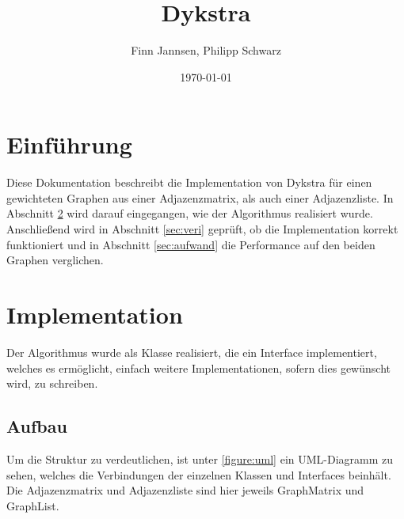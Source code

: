 \documentclass[11pt]{scrartcl}
\title{Dykstra}
\author{Finn Jannsen, Philipp Schwarz}
\date{\today{}}
\begin{document}
\maketitle

\tableofcontents

\section{Einführung}
	\label{sec:einfuehrung}
	
	Diese Dokumentation beschreibt die Implementation von Dykstra für einen gewichteten Graphen aus einer Adjazenzmatrix, als auch einer Adjazenzliste.
	In Abschnitt \ref{sec:implementation} wird darauf eingegangen, wie der Algorithmus realisiert wurde.
	Anschließend wird in Abschnitt \ref{sec:veri} geprüft, ob die Implementation korrekt funktioniert 
	und in Abschnitt \ref{sec:aufwand} die Performance auf den beiden Graphen verglichen.

\section{Implementation}
	\label{sec:implementation}
	
	Der Algorithmus wurde als Klasse realisiert, die ein Interface implementiert, welches es ermöglicht, einfach weitere Implementationen, sofern dies gewünscht wird, zu schreiben.
	
	\subsection{Aufbau}
		\label{sec:codeStruc}
		
		Um die Struktur zu verdeutlichen, ist unter \ref{figure:uml} ein UML-Diagramm zu sehen, welches die Verbindungen der einzelnen Klassen und Interfaces beinhält.
		Die Adjazenzmatrix und Adjazenzliste sind hier jeweils GraphMatrix und GraphList. 
\end{document}
